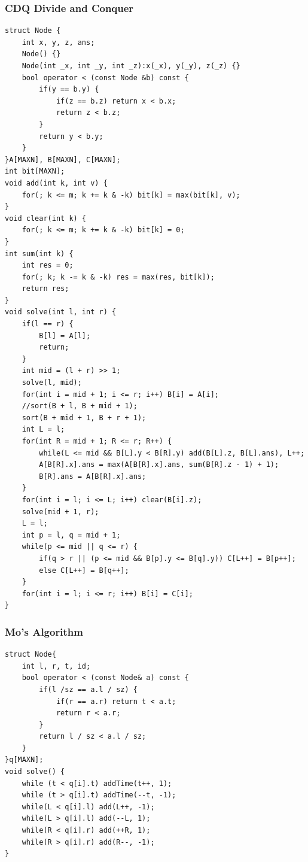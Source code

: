 \documentclass[10pt]{ctexart}
\begin{document}
{{\subsubsection{CDQ Divide and Conquer}
\begin{lstlisting}
struct Node {
    int x, y, z, ans;
    Node() {}
    Node(int _x, int _y, int _z):x(_x), y(_y), z(_z) {}
    bool operator < (const Node &b) const {
        if(y == b.y) {
            if(z == b.z) return x < b.x;
            return z < b.z;
        }
        return y < b.y;
    }
}A[MAXN], B[MAXN], C[MAXN];
int bit[MAXN];
void add(int k, int v) {
    for(; k <= m; k += k & -k) bit[k] = max(bit[k], v);
}
void clear(int k) {
    for(; k <= m; k += k & -k) bit[k] = 0;
}
int sum(int k) {
    int res = 0;
    for(; k; k -= k & -k) res = max(res, bit[k]);
    return res;
}
void solve(int l, int r) {
    if(l == r) {
        B[l] = A[l];
        return;
    }
    int mid = (l + r) >> 1;
    solve(l, mid);
    for(int i = mid + 1; i <= r; i++) B[i] = A[i];
    //sort(B + l, B + mid + 1);
    sort(B + mid + 1, B + r + 1);
    int L = l;
    for(int R = mid + 1; R <= r; R++) {
        while(L <= mid && B[L].y < B[R].y) add(B[L].z, B[L].ans), L++;
        A[B[R].x].ans = max(A[B[R].x].ans, sum(B[R].z - 1) + 1);
        B[R].ans = A[B[R].x].ans;
    }
    for(int i = l; i <= L; i++) clear(B[i].z);
    solve(mid + 1, r);
    L = l;
    int p = l, q = mid + 1;
    while(p <= mid || q <= r) {
        if(q > r || (p <= mid && B[p].y <= B[q].y)) C[L++] = B[p++];
        else C[L++] = B[q++];
    }
    for(int i = l; i <= r; i++) B[i] = C[i];
}
\end{lstlisting}
\subsubsection{Mo’s Algorithm}
\begin{lstlisting}
struct Node{
    int l, r, t, id;
    bool operator < (const Node& a) const {
        if(l /sz == a.l / sz) {
            if(r == a.r) return t < a.t;
            return r < a.r;
        }
        return l / sz < a.l / sz;
    }
}q[MAXN];
void solve() {
    while (t < q[i].t) addTime(t++, 1);
    while (t > q[i].t) addTime(--t, -1);
    while(L < q[i].l) add(L++, -1);
    while(L > q[i].l) add(--L, 1);
    while(R < q[i].r) add(++R, 1);
    while(R > q[i].r) add(R--, -1);
}
\end{lstlisting}
}}
\end{document}

